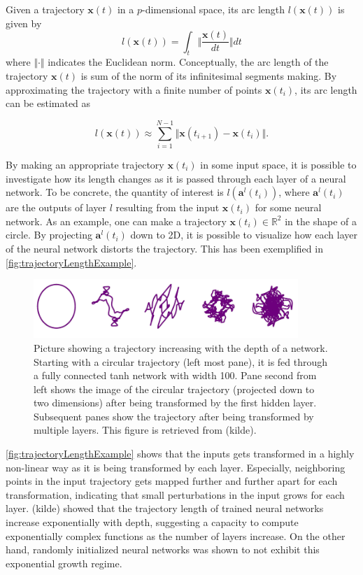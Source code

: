 Given a trajectory $\boldsymbol{x}(t)$ in a $p$-dimensional space, its arc length 
$l(\boldsymbol{x}(t))$ is given by
\begin{equation}
   l(\boldsymbol{x}(t)) = 
   \int_{t} \big\Vert \frac{\boldsymbol{x}(t)}{dt} \big\Vert dt
\end{equation}
where $\Vert \cdot\Vert$ indicates the Euclidean norm. Conceptually, the arc length of the trajectory $\boldsymbol{x}(t)$ is sum of the norm of its infinitesimal segments making. By approximating the trajectory with a finite number of points $\boldsymbol{x}(t_i)$, its arc length can be estimated as 

\begin{equation}
   l(\boldsymbol{x}(t)) \approx 
   \sum_{i=1}^{N-1} \Vert\boldsymbol{x}(t_{i+1}) - \boldsymbol{x}(t_{i})\Vert.
\end{equation}

By making an appropriate trajectory $\boldsymbol{x}(t_i)$ in some input space, it is possible to investigate how its length changes as it is passed through each layer of a neural network. To be concrete, the quantity of interest is $l(\boldsymbol{a}^{l}(t_i))$, where $\boldsymbol{a}^{l}(t_i)$ are the outputs of layer $l$ resulting from the input $\boldsymbol{x}(t_i)$ for some neural network. As an example, one can make a trajectory $\boldsymbol{x}(t_i) \in \mathbb{R}^2$ in the shape of a circle. By projecting $\boldsymbol{a}^{l}(t_i)$ down to 2D, it is possible to visualize how each layer of the neural network distorts the trajectory. This has been exemplified in \autoref{fig:trajectoryLengthExample}.

\begin{figure}[H]
    \centering
    \includegraphics[width=10cm]{latex/figures/trajectoryLengthExample.PNG}
    \caption{Picture showing a trajectory increasing with the depth
of a network. Starting with a circular trajectory (left most
pane), it is fed through a fully connected tanh network with
width 100. Pane second from left shows the image of the circular
trajectory (projected down to two dimensions) after being transformed by the first hidden layer. Subsequent panes show the trajectory after being transformed by multiple layers. This figure is retrieved from (kilde).}
\label{fig:trajectoryLengthExample}
\end{figure}

\autoref{fig:trajectoryLengthExample} shows that the inputs gets transformed in a highly non-linear way as it is being transformed by each layer. Especially, neighboring points in the input trajectory gets mapped further and further apart for each transformation, indicating that small perturbations in the input grows for each layer. (kilde) showed that the trajectory length of trained neural networks increase exponentially with depth, suggesting a capacity to compute exponentially complex functions as the number of layers increase. On the other hand, randomly initialized neural networks was shown to not exhibit this exponential growth regime.

